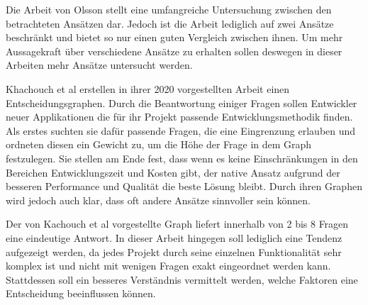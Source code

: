 Die Arbeit von Olsson stellt eine umfangreiche Untersuchung zwischen den betrachteten Ansätzen dar. Jedoch ist die Arbeit lediglich auf zwei Ansätze beschränkt und bietet so nur einen guten Vergleich zwischen ihnen. Um mehr Aussagekraft über verschiedene Ansätze zu erhalten sollen deswegen in dieser Arbeiten mehr Ansätze untersucht werden. 

Khachouch et al \cite{IEEE_Khackouch_Al} erstellen in ihrer 2020 vorgestellten Arbeit einen Entscheidungsgraphen. Durch die Beantwortung einiger Fragen sollen Entwickler neuer Applikationen die für ihr Projekt passende Entwicklungsmethodik finden. Als erstes suchten sie dafür passende Fragen, die eine Eingrenzung erlauben und ordneten diesen ein Gewicht zu, um die Höhe der Frage in dem Graph festzulegen. Sie stellen am Ende fest, dass wenn es keine Einschränkungen in den Bereichen Entwicklungszeit und Kosten gibt, der native Ansatz aufgrund der besseren Performance und Qualität die beste Lösung bleibt. Durch ihren Graphen wird jedoch auch klar, dass oft andere Ansätze sinnvoller sein können.

Der von Kachouch et al vorgestellte Graph liefert innerhalb von 2 bis 8 Fragen eine eindeutige Antwort. In dieser Arbeit hingegen soll lediglich eine Tendenz aufgezeigt werden, da jedes Projekt durch seine einzelnen Funktionalität sehr komplex ist und nicht mit wenigen Fragen exakt eingeordnet werden kann. Stattdessen soll ein besseres Verständnis vermittelt werden, welche Faktoren eine Entscheidung beeinflussen können. 